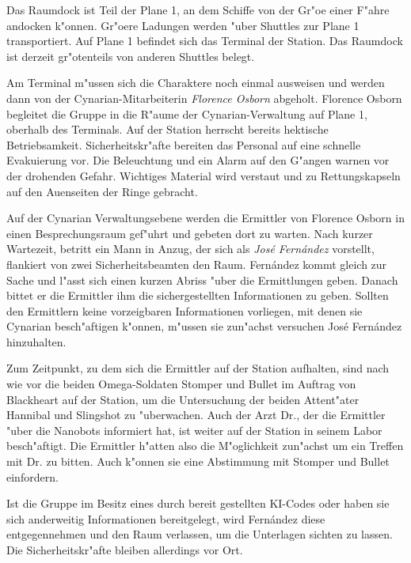 Das Raumdock ist Teil der Plane 1, an dem Schiffe von der Gr"o\3e einer F"ahre andocken k"onnen. Gr"o\3ere Ladungen werden "uber Shuttles zur Plane 1 transportiert. Auf Plane 1 befindet sich das Terminal der Station. Das Raumdock ist derzeit gr"o\3tenteils von anderen Shuttles belegt.

Am Terminal m"ussen sich die Charaktere noch einmal ausweisen und werden dann von der Cynarian-Mitarbeiterin \emph{Florence Osborn} abgeholt. Florence Osborn begleitet die Gruppe in die R"aume der Cynarian-Verwaltung auf Plane 1, oberhalb des Terminals. Auf der Station herrscht bereits hektische Betriebsamkeit. Sicherheitskr"afte bereiten das Personal auf eine schnelle Evakuierung vor. Die Beleuchtung und ein Alarm auf den G"angen warnen vor der drohenden Gefahr. Wichtiges Material wird verstaut und zu Rettungskapseln auf den Au\3enseiten der Ringe gebracht.

Auf der Cynarian Verwaltungsebene werden die Ermittler von Florence Osborn in einen Besprechungsraum gef"uhrt und gebeten dort zu warten. Nach kurzer Wartezeit, betritt ein Mann in Anzug, der sich als \emph{Jos\'e Fern\'andez} vorstellt, flankiert von zwei Sicherheitsbeamten den Raum. Fern\'andez kommt gleich zur Sache und l"asst sich einen kurzen Abriss "uber die Ermittlungen geben. Danach bittet er die Ermittler ihm die sichergestellten Informationen zu geben. Sollten den Ermittlern keine vorzeigbaren Informationen vorliegen, mit denen sie Cynarian besch"aftigen k"onnen, m"ussen sie zun"achst versuchen Jos\'e Fern\'andez hinzuhalten. 

Zum Zeitpunkt, zu dem sich die Ermittler auf der Station aufhalten, sind nach wie vor die beiden Omega-Soldaten Stomper und Bullet im Auftrag von Blackheart auf der Station, um die Untersuchung der beiden Attent"ater Hannibal und Slingshot zu "uberwachen. Auch der Arzt 
Dr.{}, der die Ermittler "uber die Nanobots informiert hat, ist weiter auf der Station in seinem Labor besch"aftigt. Die Ermittler h"atten also die M"oglichkeit zun"achst um ein Treffen mit Dr.{} zu bitten. Auch k"onnen sie eine Abstimmung mit Stomper und Bullet einfordern.

Ist die Gruppe im Besitz eines durch \ml{} bereit gestellten KI-Codes oder haben sie sich anderweitig Informationen bereitgelegt, wird Fern\'andez diese entgegennehmen und den Raum verlassen, um die Unterlagen sichten zu lassen. Die Sicherheitskr"afte bleiben allerdings vor Ort.

